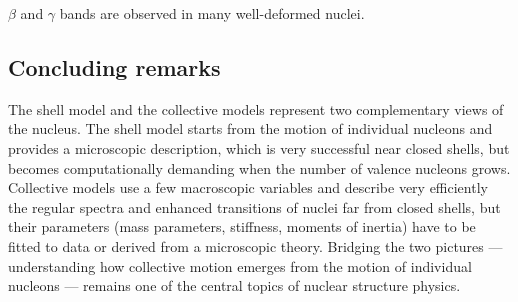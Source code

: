 \documentclass[11pt,a4paper]{article}
\begin{document}
$\beta$ and $\gamma$ bands are observed in many well-deformed nuclei.

\subsection*{Concluding remarks}
The shell model and the collective models represent two complementary views of the nucleus. The shell model starts from the motion of individual nucleons and provides a microscopic description, which is very successful near closed shells, but becomes computationally demanding when the number of valence nucleons grows. Collective models use a few macroscopic variables and describe very efficiently the regular spectra and enhanced transitions of nuclei far from closed shells, but their parameters (mass parameters, stiffness, moments of inertia) have to be fitted to data or derived from a microscopic theory. Bridging the two pictures --- understanding how collective motion emerges from the motion of individual nucleons --- remains one of the central topics of nuclear structure physics.
\end{document}
